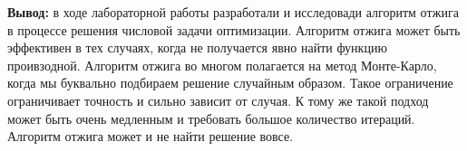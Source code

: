\documentclass[a4paper,14pt]{extarticle}
\begin{document}
\textbf{Вывод: } в ходе лабораторной работы разработали и исследовади алгоритм отжига в процессе
решения числовой задачи оптимизации. Алгоритм отжига может быть эффективен в тех случаях, когда 
не получается явно найти функцию проивзодной. Алгоритм отжига во многом полагается на метод Монте-Карло, 
когда мы буквально подбираем решение случайным образом. Такое ограничение ограничивает точность и сильно зависит
от случая. К тому же такой подход может быть очень медленным и требовать большое количество итераций. 
Алгоритм отжига может и не найти решение вовсе. 
\end{document}
